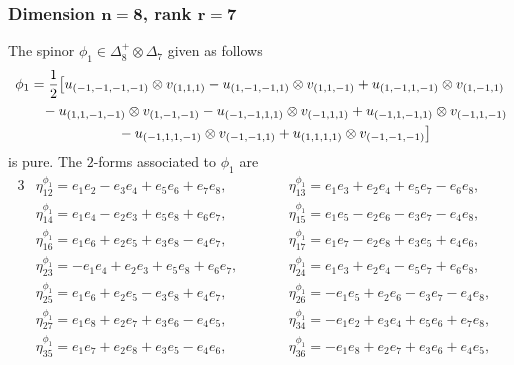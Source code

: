 \documentclass[pdftex]{sigma}
\numberwithin{equation}{section}
\begin{document}
\subsubsection[Dimension $n=8$, rank $r=7$]{Dimension $\boldsymbol{n=8}$, rank $\boldsymbol{r=7}$} \label{subsec: Spin(7)}

{\allowdisplaybreaks The spinor $\phi_1\in\Delta_8^+\otimes\Delta_7$ given as follows
\begin{gather}
{\phi_1} = {1\over 2}\big[u_{(-1,-1,-1,-1)}\otimes v_{(1,1,1)} -u_{(1,-1,-1,1)}\otimes v_{(1,1,-1)}+u_{(1,-1,1,-1)}\otimes v_{(1,-1,1)} \nonumber\\
 \hphantom{{\phi_1} =}{} -u_{(1,1,-1,-1)}\otimes v_{(1,-1,-1)} -u_{(-1,-1,1,1)}\otimes v_{(-1,1,1)} +u_{(-1,1,-1,1)}\otimes v_{(-1,1,-1)} \nonumber\\
 \hphantom{{\phi_1} =}{}-u_{(-1,1,1,-1)}\otimes v_{(-1,-1,1)} +u_{(1,1,1,1)}\otimes v_{(-1,-1,-1)} \big]\label{eq: rank 7 pure spinor}
\end{gather}
is pure. The $2$-forms associated to $\phi_1$ are
\begin{alignat*}{3}
& \eta^{\phi_1}_{1 2} = e_{1} e_{2} - e_{3} e_{4} + e_{5} e_{6} + e_{7} e_{8},\qquad &&
 \eta^{\phi_1}_{1 3} = e_{1} e_{3} + e_{2} e_{4} + e_{5} e_{7} - e_{6} e_{8},&\\
& \eta^{\phi_1}_{1 4} = e_{1} e_{4} - e_{2} e_{3} + e_{5} e_{8} + e_{6} e_{7},\qquad &&
 \eta^{\phi_1}_{1 5} = e_{1} e_{5} - e_{2} e_{6} - e_{3} e_{7} - e_{4} e_{8},&\\
& \eta^{\phi_1}_{1 6} = e_{1} e_{6} + e_{2} e_{5} + e_{3} e_{8} - e_{4} e_{7},\qquad &&
 \eta^{\phi_1}_{1 7} = e_{1} e_{7} - e_{2} e_{8} + e_{3} e_{5} + e_{4} e_{6},&\\
& \eta^{\phi_1}_{2 3} = -e_{1} e_{4} + e_{2} e_{3} + e_{5} e_{8} + e_{6} e_{7},\qquad &&
 \eta^{\phi_1}_{2 4} = e_{1} e_{3} + e_{2} e_{4} - e_{5} e_{7} + e_{6} e_{8},&\\
& \eta^{\phi_1}_{2 5} = e_{1} e_{6} + e_{2} e_{5} - e_{3} e_{8} + e_{4} e_{7},\qquad &&
 \eta^{\phi_1}_{2 6} = -e_{1} e_{5} + e_{2} e_{6} - e_{3} e_{7} - e_{4} e_{8},&\\
& \eta^{\phi_1}_{2 7} = e_{1} e_{8} + e_{2} e_{7} + e_{3} e_{6} - e_{4} e_{5},\qquad &&
 \eta^{\phi_1}_{3 4} = -e_{1} e_{2} + e_{3} e_{4} + e_{5} e_{6} + e_{7} e_{8},&\\
& \eta^{\phi_1}_{3 5} = e_{1} e_{7} + e_{2} e_{8} + e_{3} e_{5} - e_{4} e_{6},\qquad &&
 \eta^{\phi_1}_{3 6} = -e_{1} e_{8} + e_{2} e_{7} + e_{3} e_{6} + e_{4} e_{5},&\\

\end{alignat*}}
\end{document}
